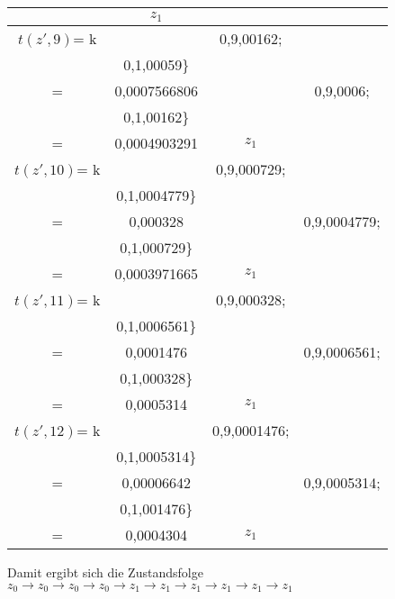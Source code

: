 \begin{center}
\begin{tabular}{cccc}
					\) & \(z_{1}\)\\ \hline
\(t(z',9)\)= k	& \(	\begin{array} {r@{}l@{}}
							0,5\cdot\max\{	& 0,9\cdot0,00162; \\
											& 0,1\cdot0,00059\}\\
										   =& 0,0007566806
					\end{array}
					\)
				&   \(	\begin{array} {r@{}l@{}}
							0,9\cdot\max\{	& 0,9\cdot0,0006; \\
											& 0,1\cdot0,00162\}\\
										   =& 0,0004903291
					\end{array}
					\) & \(z_{1}\)\\ \hline
\(t(z',10)\)= k	& \(	\begin{array} {r@{}l@{}}
							0,5\cdot\max\{	& 0,9\cdot0,000729; \\
											& 0,1\cdot0,0004779\}\\
										   =& 0,000328
					\end{array}
					\)
				&   \(	\begin{array} {r@{}l@{}}
							0,9\cdot\max\{	& 0,9\cdot0,0004779; \\
											& 0,1\cdot0,000729\}\\
										   =& 0,0003971665
					\end{array}
					\) & \(z_{1}\)\\ \hline
\(t(z',11)\)= k	& \(	\begin{array} {r@{}l@{}}
							0,5\cdot\max\{	& 0,9\cdot0,000328; \\
											& 0,1\cdot0,0006561\}\\
										   =& 0,0001476
					\end{array}
					\)
				&   \(	\begin{array} {r@{}l@{}}
							0,9\cdot\max\{	& 0,9\cdot0,0006561; \\
											& 0,1\cdot0,000328\}\\
										   =& 0,0005314
					\end{array}
					\) & \(z_{1}\)\\ \hline
\(t(z',12)\)= k	& \(	\begin{array} {r@{}l@{}}
							0,5\cdot\max\{	& 0,9\cdot0,0001476; \\
											& 0,1\cdot0,0005314\}\\
										   =& 0,00006642
					\end{array}
					\)
				&   \(	\begin{array} {r@{}l@{}}
							0,9\cdot\max\{	& 0,9\cdot0,0005314; \\
											& 0,1\cdot0,001476\}\\
										   =& 0,0004304
					\end{array}
					\) & \(z_{1}\)
\end{tabular}
\end{center}
Damit ergibt sich die Zustandsfolge \(z_{0} \rightarrow z_{0} \rightarrow z_{0} \rightarrow z_{0} \rightarrow z_{1} \rightarrow z_{1}\rightarrow z_{1} \rightarrow z_{1}\rightarrow z_{1}\rightarrow z_{1}\)


